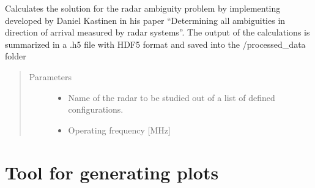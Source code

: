 \documentclass[letterpaper,10pt,english]{sphinxmanual}
\begin{document}
\begin{fulllineitems}
\label{\detokenize{radar:ambiguity_calculator.ambiguities_calculate}}
Calculates the solution for the radar ambiguity problem by implementing developed by Daniel Kastinen in his paper
“Determining all ambiguities in direction of arrival measured by radar systems”. The output of the calculations is
summarized in a .h5 file with HDF5 format and saved into the /processed\_data folder
\begin{quote}\begin{description}
\item[{Parameters}] \leavevmode\begin{itemize}
\item {} 
 \textendash{} Name of the radar to be studied out of a list of defined configurations.

\item {} 
 \textendash{} Operating frequency {[}MHz{]}

\end{itemize}

\end{description}\end{quote}

\end{fulllineitems}



\chapter{Tool for generating plots}
\label{\detokenize{plots_generator:module-plots_generator}}\label{\detokenize{plots_generator:tool-for-generating-plots}}\label{\detokenize{plots_generator::doc}}
\end{document}
